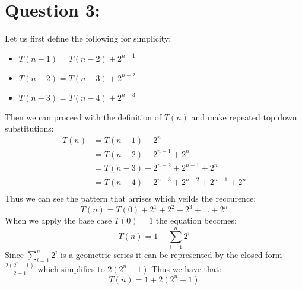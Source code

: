 \documentclass{article}
\begin{document}
\section*{Question 3:}
Let us first define the following for simplicity:
\begin{itemize}
    \item $T(n-1)=T(n-2)+2^{n-1}$
    \item $T(n-2)=T(n-3)+2^{n-2}$
    \item $T(n-3)=T(n-4)+2^{n-3}$
\end{itemize}
Then we can proceed with the definition of $T(n)$ and make repeated top down substitutions:
$$\begin{aligned}
    T(n)&=T(n-1)+2^{n}\\
    &=T(n-2)+2^{n-1}+2^{n}\\
    &=T(n-3)+2^{n-2}+2^{n-1}+2^{n}\\
    &=T(n-4)+2^{n-3}+2^{n-2}+2^{n-1}+2^{n}\\
\end{aligned}$$
Thus we can see the pattern that arrises which yeilds the reccurence: $$T(n)=T(0)+2^{1}+2^{2}+2^{3}+\dots+2^{n}$$
When we apply the base case $T(0)=1$ the equation becomes: $$T(n)=1+\sum_{i=1}^n 2^{i}$$
Since $\sum_{i=1}^n 2^{i}$ is a geometric series it can be represented by the closed form $\frac{2(2^{n}-1)}{2-1}$ which simplifies to $2(2^{n}-1)$
Thus we have that: $$T(n)=1+2(2^{n}-1)$$


\newpage
\end{document}
